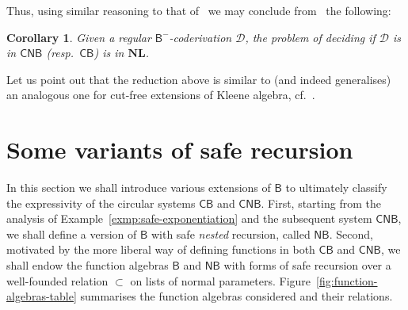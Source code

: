 \documentclass[manuscript,screen]{acmart}
\newtheorem{cor}[thm]{Corollary}
\theoremstyle{definition}
\theoremstyle{remark}
\newtheorem{rem}[thm]{Remark}
\newcommand{\permpref}{\subset}
\newcommand{\n}{N}
\newcommand{\sq}{\Box}
\newcommand{\sqn}{{\sq\n}}
\newcommand{\sn}{\sqn}
\newcommand{\bc}{\mathsf{B}}
\newcommand{\bcnorec}{\bc^{-}}
\newcommand{\nested}{\mathsf{N}}
\newcommand{\nbc}{\nested\bc}
\newcommand{\der}{\mathcal{D}}
\newcommand{\cyclic}{\mathsf{C}}
\newcommand{\cbc}{\cyclic\bc}
\newcommand{\ncbc}{\cyclic\nested\bc}
\begin{document}
Thus, using similar reasoning to that of~  we may conclude from~ the following:
\begin{cor} \label{rem:NL} Given a regular  $\bcnorec$-coderivation $\der$, the problem of deciding if $\der$ is in $\ncbc$ (resp.~$\cbc$)  is in  $\mathbf{NL}$.
\end{cor}

Let us point out that the reduction above is similar to (and indeed generalises) an analogous one for cut-free extensions of Kleene algebra, cf.~\cite[Proposition 8]{DP18}.




\section{Some variants of safe recursion}\label{sec:some-variants}
In this section we shall introduce various extensions of $\bc$ to ultimately classify the expressivity of the circular systems $\cbc$ and  $\ncbc$. 
First, starting from the analysis of   Example~\ref{exmp:safe-exponentiation} and  the subsequent system $\ncbc$, we shall define a version of $\bc$ with safe \emph{nested} recursion, called $\nbc$. 
Second, motivated by the more liberal way of defining functions in both $\cbc$ and $\ncbc$, we shall endow the function algebras $\bc$ and $\nbc$ with forms of safe recursion over a well-founded relation $\permpref$ on lists of normal parameters.  Figure~\ref{fig:function-algebras-table} summarises the function algebras considered and their relations.
\end{document}
